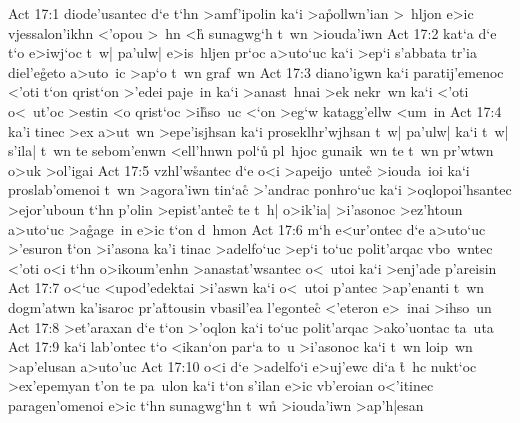 \vs Act 17:1
diode'usantec
d`e
t`hn
>amf'ipolin
ka`i
>a\r{p}ollwn'ian
>~hljon
e>ic
vjessalon'ikhn
<'opou
>~hn
<h\r{}
sunagwg`h
t~wn
>iouda'iwn\bibvsend
\vs Act 17:2
kat`a
d`e
t`o
e>iwj`oc
t~w|
pa'ulw|
e>is~hljen
pr`oc
a>uto`uc
ka`i
>ep`i
s'abbata
tr'ia
diel'e\r{g}eto
a>uto~ic
>ap`o
t~wn
graf~wn\bibvsend
\vs Act 17:3
diano'igwn
ka`i
paratij'emenoc
<'oti
t`on
qrist`on
>'edei
paje~in
ka`i
>anast~hnai
>ek
nekr~wn
ka`i
<'oti
o<~ut'oc
>estin
<o
qrist`oc
>i\r{h}so~uc
<`on
>eg`w
katagg'ellw
<um~in\bibvsend
\vs Act 17:4
ka'i
tinec
>ex
a>ut~wn
>epe'isjhsan
ka`i
proseklhr'wjhsan
t~w|
pa'ulw|
ka`i
t~w|
s'ila|
t~wn
te
sebom'enwn
<ell'hnwn
pol`u\r{}
pl~hjoc
gunaik~wn
te
t~wn
pr'wtwn
o>uk
>ol'igai\bibvsend
\vs Act 17:5
vzhl'w\r{s}antec
d`e
o<i
>apeijo~untec\r{}
>iouda~ioi
ka`i
proslab'omenoi
t~wn
>agora'iwn
tin`ac\r{}
>'andrac
ponhro`uc
ka`i
>oqlopoi'hsantec
>ejor'uboun
t`hn
p'olin
>epist'antec\r{}
te
t~h|
o>ik'ia|
>i'asonoc
>ez'htoun
a>uto`uc
>a\r{g}age~in
e>ic
t`on
d~hmon\bibvsend
\vs Act 17:6
m`h
e<ur'ontec
d`e
a>uto`uc
>'esuron
\r{t}`on
>i'asona
ka'i
tinac
>adelfo`uc
>ep`i
to`uc
polit'arqac
vbo~wntec
<'oti
o<i
t`hn
o>ikoum'enhn
>anastat'wsantec
o<~utoi
ka`i
>enj'ade
p'areisin\bibvsend
\vs Act 17:7
o<`uc
<upod'edektai
>i'aswn
ka`i
o<~utoi
p'antec
>ap'enanti
t~wn
dogm'atwn
ka'isaroc
pr'a\r{t}tousin
vbasil'ea
l'egontec\r{}
<'eteron
e>~inai
>ihso~un\bibvsend
\vs Act 17:8
>et'araxan
d`e
t`on
>'oqlon
ka`i
to`uc
polit'arqac
>ako'uontac
ta~uta\bibvsend
\vs Act 17:9
ka`i
lab'ontec
t`o
<ikan`on
par`a
to~u
>i'asonoc
ka`i
t~wn
loip~wn
>ap'elusan
a>uto'uc\bibvsend
\vs Act 17:10
o<i
d`e
>adelfo`i
e>uj'ewc
di`a
\r{t}~hc
nukt`oc
>ex'epemyan
t'on
te
pa~ulon
ka`i
t`on
s'ilan
e>ic
vb'eroian
o<'itinec
paragen'omenoi
e>ic
t`hn
sunagwg`hn
t~wn\r{}
>iouda'iwn
>ap'h|esan\bibvsend
